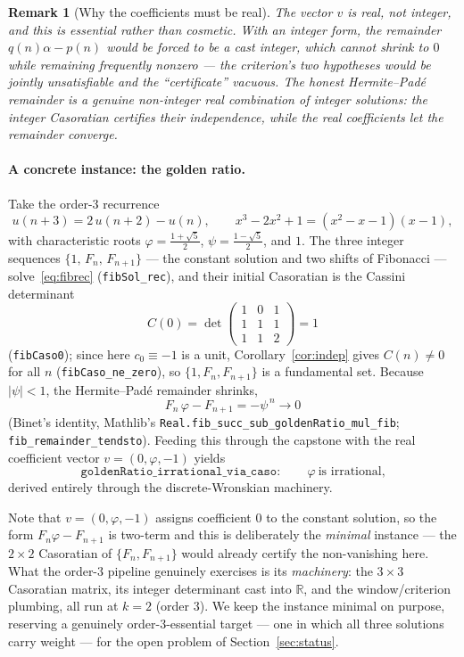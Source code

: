 \documentclass[11pt]{article}
\newtheorem{remark}[theorem]{Remark}
\newcommand{\R}{\mathbb{R}}
\newcommand{\Caso}{C}
\begin{document}
\begin{remark}[Why the coefficients must be real]\label{rem:realv}
The vector $v$ is real, not integer, and this is essential rather than cosmetic. With an
integer form, the remainder $q(n)\alpha-p(n)$ would be forced to be a cast integer,
which cannot shrink to $0$ while remaining frequently nonzero --- the criterion's two
hypotheses would be jointly unsatisfiable and the ``certificate'' \emph{vacuous}. The
honest Hermite--Pad\'e remainder is a genuine non-integer real combination of integer
solutions: the integer Casoratian certifies their independence, while the real
coefficients let the remainder converge.
\end{remark}

\paragraph{A concrete instance: the golden ratio.}
Take the order-$3$ recurrence
\begin{equation}\label{eq:fibrec}
  u(n+3)=2\,u(n+2)-u(n),\qquad x^3-2x^2+1=(x^2-x-1)(x-1),
\end{equation}
with characteristic roots $\varphi=\tfrac{1+\sqrt5}{2}$, $\psi=\tfrac{1-\sqrt5}{2}$,
and $1$. The three integer sequences $\{1,\,F_n,\,F_{n+1}\}$ --- the constant solution
and two shifts of Fibonacci --- solve~\eqref{eq:fibrec} (\texttt{fibSol\_rec}), and their
initial Casoratian is the Cassini determinant
\[
  \Caso(0)=\det\!\begin{pmatrix}1&0&1\\ 1&1&1\\ 1&1&2\end{pmatrix}=1
\]
(\texttt{fibCaso0}); since here $c_0\equiv-1$ is a unit, Corollary~\ref{cor:indep} gives
$\Caso(n)\ne0$ for all $n$ (\texttt{fibCaso\_ne\_zero}), so $\{1,F_n,F_{n+1}\}$ is a
fundamental set. Because $|\psi|<1$, the Hermite--Pad\'e remainder shrinks,
\[
  F_n\,\varphi-F_{n+1}=-\psi^{\,n}\longrightarrow 0
\]
(Binet's identity, Mathlib's \texttt{Real.fib\_succ\_sub\_goldenRatio\_mul\_fib};
\texttt{fib\_remainder\_tendsto}). Feeding this through the capstone with the real
coefficient vector $v=(0,\varphi,-1)$ yields
\[
  \texttt{goldenRatio\_irrational\_via\_caso}:\qquad \varphi\ \text{is irrational,}
\]
derived entirely through the discrete-Wronskian machinery.

Note that $v=(0,\varphi,-1)$ assigns coefficient $0$ to the constant solution, so the
form $F_n\varphi-F_{n+1}$ is two-term and this is deliberately the \emph{minimal}
instance --- the $2\times2$ Casoratian of $\{F_n,F_{n+1}\}$ would already certify the
non-vanishing here. What the order-$3$ pipeline genuinely exercises is its
\emph{machinery}: the $3\times3$ Casoratian matrix, its integer determinant cast into
$\R$, and the window/criterion plumbing, all run at $k=2$ (order $3$). We keep the
instance minimal on purpose, reserving a genuinely order-$3$-essential target --- one in
which all three solutions carry weight --- for the open problem of
Section~\ref{sec:status}.
\end{document}
